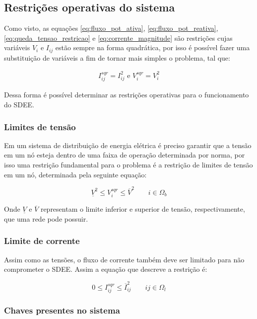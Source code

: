 \subsection{Restrições operativas do sistema}

Como visto, as equações \ref{eq:fluxo_pot_ativa}, \ref{eq:fluxo_pot_reativa}, \ref{eq:queda_tensao_restricao} e \ref{eq:corrente_magnitude} são restrições cujas variáveis $V_{i}$ e $I_{ij}$ estão sempre na forma quadrática, por isso é possível fazer uma substituição de variáveis a fim de tornar mais simples o problema, tal que:

\begin{align*}
    I_{ij}^{sqr} = I_{ij}^{2} \text{ e } V_{i}^{sqr} = V_{i}^{2} 
\end{align*}

Dessa forma é possível determinar as restrições operativas para o funcionamento do SDEE.

\subsubsection{Limites de tensão}

Em um sistema de distribuição de energia elétrica é preciso garantir que a tensão em um nó esteja dentro de uma faixa de operação determinada por norma, por isso uma restrição fundamental para o problema é a restrição de limites de tensão em um nó, determinada pela seguinte equação:

\begin{equation}
    \underline{V}^{2} \leq V_{i}^{sqr} \leq \overline{V}^{2}\qquad i \in\Omega_{b}
\end{equation}

Onde $\underline{V}$ e $\overline{V}$ representam o limite inferior e superior de tensão, respectivamente, que uma rede pode possuir.


\subsubsection{Limite de corrente}

Assim como as tensões, o fluxo de corrente também deve ser limitado para não comprometer o SDEE.
Assim a equação que descreve a restrição é:

\begin{equation}
    0 \leq I_{ij}^{sqr} \leq \overline{I}_{ij}^{2} \qquad ij\in\Omega_{l} 
\end{equation}

\subsubsection{Chaves presentes no sistema}

